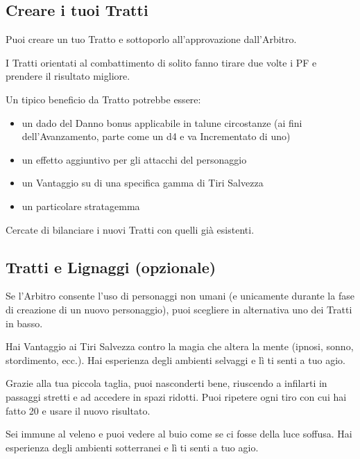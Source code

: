 \documentclass[itdr]{subfiles}
\begin{document}
\vfill
\vfill
{}
\vfill
\vfill

\begin{dbox}
\subsection*{Creare i tuoi Tratti}

Puoi creare un tuo Tratto e sottoporlo all’approvazione dall’Arbitro.

I Tratti orientati al combattimento di solito fanno tirare due volte i PF e prendere il risultato migliore.

Un tipico beneficio da Tratto potrebbe essere:
\begin{itemize}
	\item un dado del Danno bonus applicabile in talune circostanze (ai fini dell’Avanzamento, parte come un d4 e va Incrementato di uno)
	\item un effetto aggiuntivo per gli attacchi del personaggio
	\item un Vantaggio su di una specifica gamma di Tiri Salvezza
	\item un particolare stratagemma
\end{itemize}

Cercate di bilanciare i nuovi Tratti con quelli già esistenti.\hspace{-0.6em}
\end{dbox}

\vfill
\subsection*{Tratti e Lignaggi (opzionale)}

Se l’Arbitro consente l’uso di personaggi non umani (e unicamente durante la fase di creazione di un nuovo personaggio), puoi scegliere in alternativa uno dei Tratti in basso.

\vfill
{}
Hai Vantaggio ai Tiri Salvezza contro la magia che altera la mente (ipnosi, sonno, stordimento, ecc.). Hai esperienza degli ambienti selvaggi e lì ti senti a tuo agio.

\vfill
{}
Grazie alla tua piccola taglia, puoi nasconderti bene, riuscendo a infilarti in passaggi stretti e ad accedere in spazi ridotti. Puoi ripetere ogni tiro con cui hai fatto 20 e usare il nuovo risultato.

Sei immune al veleno e puoi vedere al buio come se ci fosse della luce soffusa. Hai esperienza degli ambienti sotterranei e lì ti senti a tuo agio.
\end{document}
